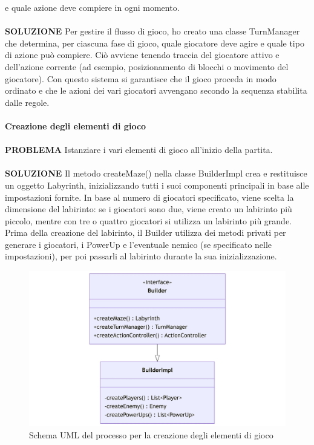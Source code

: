\documentclass[a4paper,12pt]{report}
\begin{document}
e quale azione deve compiere in ogni momento.
\\
\\
\textbf{SOLUZIONE}
Per gestire il flusso di gioco, ho creato una classe TurnManager che determina, per ciascuna fase di gioco, 
quale giocatore deve agire e quale tipo di azione può compiere. Ciò avviene tenendo traccia del giocatore attivo e 
dell’azione corrente (ad esempio, posizionamento di blocchi o movimento del giocatore).
Con questo sistema si garantisce che il gioco proceda in modo ordinato e che le azioni dei vari giocatori avvengano 
secondo la sequenza stabilita dalle regole.
\\
\\
\textbf{Creazione degli elementi di gioco}
\\
\\
\textbf{PROBLEMA}
Istanziare i vari elementi di gioco all’inizio della partita.
\\
\\
\textbf{SOLUZIONE}
Il metodo createMaze() nella classe BuilderImpl crea e restituisce un oggetto Labyrinth, inizializzando tutti i 
suoi componenti principali in base alle impostazioni fornite.
In base al numero di giocatori specificato, viene scelta la dimensione del labirinto: se i giocatori sono due, 
viene creato un labirinto più piccolo, mentre con tre o quattro giocatori si utilizza un labirinto più grande.
Prima della creazione del labirinto, il Builder utilizza dei metodi privati per generare i giocatori, i PowerUp 
e l’eventuale nemico (se specificato nelle impostazioni), per poi passarli al labirinto durante la sua inizializzazione.
\begin{figure}[H]
	\centering{}
	\includegraphics[width=14cm]{img/CreazioneElementi.png}
	\caption{Schema UML del processo per la creazione degli elementi di gioco}
	\label{img:Creazione Elementi}
\end{figure}
\end{document}
